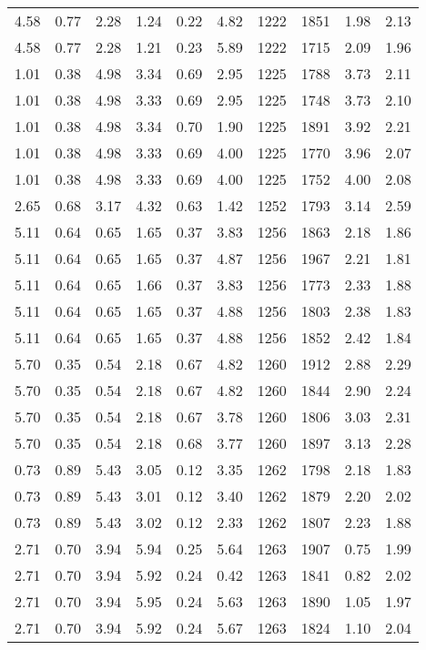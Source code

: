 \begin{longtable}{rrrrrrrrrr}
4.58	&	0.77	&	2.28	&	1.24	&	0.22	&	4.82	&	1222	&	1851	&	1.98	&	2.13	\\
4.58	&	0.77	&	2.28	&	1.21	&	0.23	&	5.89	&	1222	&	1715	&	2.09	&	1.96	\\
1.01	&	0.38	&	4.98	&	3.34	&	0.69	&	2.95	&	1225	&	1788	&	3.73	&	2.11	\\
1.01	&	0.38	&	4.98	&	3.33	&	0.69	&	2.95	&	1225	&	1748	&	3.73	&	2.10	\\
1.01	&	0.38	&	4.98	&	3.34	&	0.70	&	1.90	&	1225	&	1891	&	3.92	&	2.21	\\
1.01	&	0.38	&	4.98	&	3.33	&	0.69	&	4.00	&	1225	&	1770	&	3.96	&	2.07	\\
1.01	&	0.38	&	4.98	&	3.33	&	0.69	&	4.00	&	1225	&	1752	&	4.00	&	2.08	\\
2.65	&	0.68	&	3.17	&	4.32	&	0.63	&	1.42	&	1252	&	1793	&	3.14	&	2.59	\\
5.11	&	0.64	&	0.65	&	1.65	&	0.37	&	3.83	&	1256	&	1863	&	2.18	&	1.86	\\
5.11	&	0.64	&	0.65	&	1.65	&	0.37	&	4.87	&	1256	&	1967	&	2.21	&	1.81	\\
5.11	&	0.64	&	0.65	&	1.66	&	0.37	&	3.83	&	1256	&	1773	&	2.33	&	1.88	\\
5.11	&	0.64	&	0.65	&	1.65	&	0.37	&	4.88	&	1256	&	1803	&	2.38	&	1.83	\\
5.11	&	0.64	&	0.65	&	1.65	&	0.37	&	4.88	&	1256	&	1852	&	2.42	&	1.84	\\
5.70	&	0.35	&	0.54	&	2.18	&	0.67	&	4.82	&	1260	&	1912	&	2.88	&	2.29	\\
5.70	&	0.35	&	0.54	&	2.18	&	0.67	&	4.82	&	1260	&	1844	&	2.90	&	2.24	\\
5.70	&	0.35	&	0.54	&	2.18	&	0.67	&	3.78	&	1260	&	1806	&	3.03	&	2.31	\\
5.70	&	0.35	&	0.54	&	2.18	&	0.68	&	3.77	&	1260	&	1897	&	3.13	&	2.28	\\
0.73	&	0.89	&	5.43	&	3.05	&	0.12	&	3.35	&	1262	&	1798	&	2.18	&	1.83	\\
0.73	&	0.89	&	5.43	&	3.01	&	0.12	&	3.40	&	1262	&	1879	&	2.20	&	2.02	\\
0.73	&	0.89	&	5.43	&	3.02	&	0.12	&	2.33	&	1262	&	1807	&	2.23	&	1.88	\\
2.71	&	0.70	&	3.94	&	5.94	&	0.25	&	5.64	&	1263	&	1907	&	0.75	&	1.99	\\
2.71	&	0.70	&	3.94	&	5.92	&	0.24	&	0.42	&	1263	&	1841	&	0.82	&	2.02	\\
2.71	&	0.70	&	3.94	&	5.95	&	0.24	&	5.63	&	1263	&	1890	&	1.05	&	1.97	\\
2.71	&	0.70	&	3.94	&	5.92	&	0.24	&	5.67	&	1263	&	1824	&	1.10	&	2.04	\\

\end{longtable}
